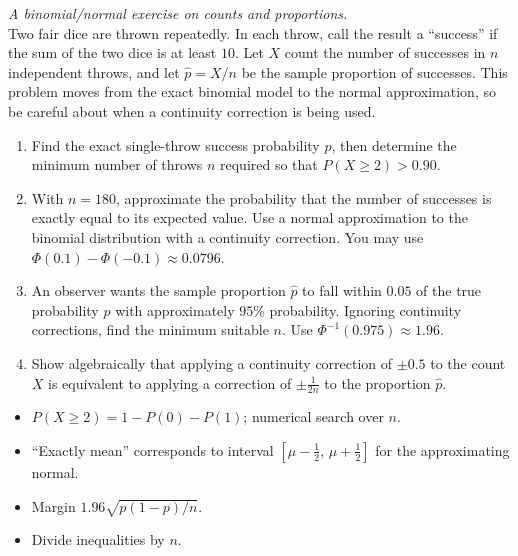 
\begin{problem}
\textit{A binomial/normal exercise on counts and proportions.}\\
Two fair dice are thrown repeatedly. In each throw, call the result a ``success'' if the sum of the two dice is at least $10$. Let $X$ count the number of successes in $n$ independent throws, and let $\hat p=X/n$ be the sample proportion of successes. This problem moves from the exact binomial model to the normal approximation, so be careful about when a continuity correction is being used.
\begin{enumerate}[label=\textbf{(\roman*)}]
\item Find the exact single-throw success probability $p$, then determine the minimum number of throws $n$ required so that $P(X\ge 2)>0{.}90$.

\item With $n=180$, approximate the probability that the number of successes is exactly equal to its expected value. Use a normal approximation to the binomial distribution with a continuity correction. You may use $\Phi(0{.}1)-\Phi(-0{.}1)\approx 0{.}0796$.

\item An observer wants the sample proportion $\hat p$ to fall within $0{.}05$ of the true probability $p$ with approximately $95\%$ probability. Ignoring continuity corrections, find the minimum suitable $n$. Use $\Phi^{-1}(0{.}975)\approx 1{.}96$.

\item Show algebraically that applying a continuity correction of $\pm 0{.}5$ to the count $X$ is equivalent to applying a correction of $\pm\frac{1}{2n}$ to the proportion $\hat p$.
\end{enumerate}


\end{problem}

\begin{hint}
\begin{itemize}[leftmargin=*]
\item $P(X\ge 2)=1-P(0)-P(1)$; numerical search over $n$.
\item ``Exactly mean'' corresponds to interval $[\mu-\tfrac12,\,\mu+\tfrac12]$ for the approximating normal.
\item Margin $1{.}96\sqrt{p(1-p)/n}$.
\item Divide inequalities by $n$.
\end{itemize}
\end{hint}

